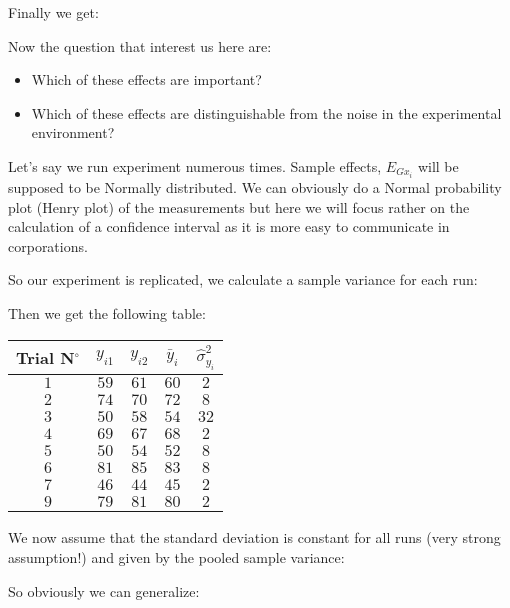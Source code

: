 	Finally we get:
	
	Now the question that interest us here are:
	\begin{itemize}
		\item Which of these effects are important?
		\item Which of these effects are distinguishable from the noise in the experimental environment?
	\end{itemize}
	Let's say we run experiment numerous times. Sample effects, $E_{Gx_i}$ will be supposed to be Normally distributed. We can obviously do a Normal probability plot (Henry plot) of the measurements but here we will focus rather on the calculation of a confidence interval as it is more easy to communicate in corporations.

	So our experiment is replicated, we calculate a sample variance for each run:
	
	Then we get the following table:
	\begin{table}[H]\centering
	\begin{center}
			\begin{tabular}{|c|c|c|c|c|}
				\hline
				\multicolumn{1}{c}{\cellcolor{black!30}\textbf{Trial N${}^\circ$}} & 
  \multicolumn{1}{c}{\cellcolor{black!30}$y_{i1}$} & 
  \multicolumn{1}{c}{\cellcolor{black!30}$y_{i2}$} & 
  \multicolumn{1}{c}{\cellcolor{black!30}$\bar{y}_i$} & 
  \multicolumn{1}{c}{\cellcolor{black!30}$\hat{\sigma}_{y_i}^2$} \\ \hline
				 $1$ & $59$ & $61$ & $60$ & $2$\\ \hline
				 $2$ & $74$ & $70$ & $72$ & $8$\\ \hline
				 $3$ & $50$ & $58$ & $54$ & $32$\\ \hline
				 $4$ & $69$ & $67$ & $68$ & $2$\\ \hline
				 $5$ & $50$ & $54$ & $52$ & $8$\\ \hline
				 $6$ & $81$ & $85$ & $83$ & $8$\\ \hline
				 $7$ & $46$ & $44$ & $45$ & $2$\\ \hline
				 $9$ & $79$ & $81$ & $80$ & $2$\\ \hline
		\end{tabular}
	\end{center}
	\end{table}	
	We now assume that the standard deviation is constant for all runs (very strong assumption!) and given by the pooled sample variance:
	
	So obviously we can generalize:
	
